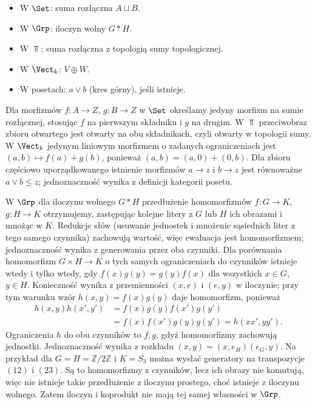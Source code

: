 \begin{przyklad}\label{cat:ex:cross-coproducts}
\leavevmode\par\noindent
\begin{itemize}
\item W $\Set$: suma rozłączna $A\sqcup B$.
\item W $\Grp$: iloczyn wolny $G*H$.
\item W $\Top$: suma rozłączna z topologią sumy topologicznej.
\item W $\Vect_k$: $V\oplus W$.
\item W posetach: $a\vee b$ (kres górny), jeśli istnieje.
\end{itemize}
Dla morfizmów $f:A\to Z$, $g:B\to Z$ w $\Set$ określamy jedyny morfizm na sumie rozłącznej, stosując $f$ na pierwszym składniku i $g$ na drugim. W $\Top$ przeciwobraz zbioru otwartego jest otwarty na obu składnikach, czyli otwarty w topologii sumy. W $\Vect_k$ jedynym liniowym morfizmem o zadanych ograniczeniach jest $(a,b)\mapsto f(a)+g(b)$, ponieważ $(a,b)=(a,0)+(0,b)$. Dla zbioru częściowo uporządkowanego istnienie morfizmów $a\to z$ i $b\to z$ jest równoważne $a\vee b\leq z$; jednoznaczność wynika z definicji kategorii posetu.

W $\Grp$ dla iloczynu wolnego $G*H$ przedłużenie homomorfizmów $f:G\to K$, $g:H\to K$ otrzymujemy, zastępując kolejne litery z $G$ lub $H$ ich obrazami i mnożąc w $K$. Redukcje słów (usuwanie jednostek i mnożenie sąsiednich liter z tego samego czynnika) zachowują wartość, więc ewaluacja jest homomorfizmem; jednoznaczność wynika z generowania przez oba czynniki. Dla porównania homomorfizm $G\times H\to K$ o tych samych ograniczeniach do czynników istnieje wtedy i tylko wtedy, gdy $f(x)g(y)=g(y)f(x)$ dla wszystkich $x\in G$, $y\in H$. Konieczność wynika z przemienności $(x,e)$ i $(e,y)$ w iloczynie; przy tym warunku wzór $h(x,y)=f(x)g(y)$ daje homomorfizm, ponieważ
\[
\begin{aligned}
h(x,y)h(x',y')&=f(x)g(y)f(x')g(y')\\
&=f(x)f(x')g(y)g(y')=h(xx',yy').
\end{aligned}
\]
Ograniczenia $h$ do obu czynników to $f,g$, gdyż homomorfizmy zachowują jednostki. Jednoznaczność wynika z rozkładu $(x,y)=(x,e_H)(e_G,y)$. Na przykład dla $G=H=\mathbb Z/2\mathbb Z$ i $K=S_3$ można wysłać generatory na transpozycje $(12)$ i $(23)$. Są to homomorfizmy z czynników, lecz ich obrazy nie komutują, więc nie istnieje takie przedłużenie z iloczynu prostego, choć istnieje z iloczynu wolnego. Zatem iloczyn i koprodukt nie mają tej samej własności w $\Grp$.
\end{przyklad}

